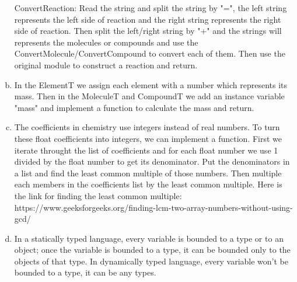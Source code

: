 \documentclass[12pt]{article}
\begin{document}
\begin{enumerate}[a)]
ConvertReaction: Read the string and split the string by "=", the left string represents the left side of reaction and the right string represents the right side of reaction. Then split the left/right string by "+" and the strings will represents the molecules or compounds and use the ConvertMolecule/ConvertCompound to convert each of them. Then use the original module to construct a reaction and return.
\item In the ElementT we assign each element with a number which represents its mass. Then in the MoleculeT and CompoundT we add an instance variable "mass" and implement a function to calculate the mass and return.
\item The coefficients in chemistry use integers instead of real numbers. To turn these float coefficients into integers, we can implement a function. First we iterate throught the list of coefficients and for each float number we use 1 divided by the float number to get its denominator. Put the denominators in a list and find the least common multiple of those numbers. Then multiple each members in the coefficients list by the least common multiple.
Here is the link for finding the least common multiple: https://www.geeksforgeeks.org/finding-lcm-two-array-numbers-without-using-gcd/
\item In a statically typed language, every variable is bounded to a type or to an object; once the variable is bounded to a type, it can be bounded only to the objects of that type. In dynamically typed language, every variable won't be bounded to a type, it can be any types.\\


\end{enumerate}
\end{document}
